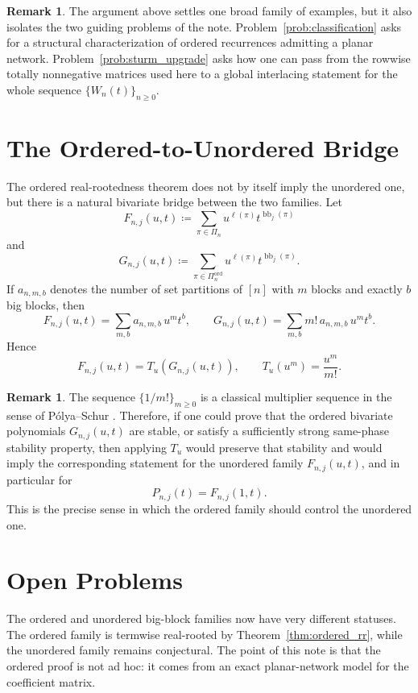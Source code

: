 \documentclass[11pt,reqno]{amsart}
\theoremstyle{definition}
\newtheorem{remark}[theorem]{Remark}
\begin{document}
\begin{remark}\label{rem:template_problem}
The argument above settles one broad family of examples, but it also isolates
the two guiding problems of the note. Problem~\ref{prob:classification} asks
for a structural characterization of ordered recurrences admitting a planar
network. Problem~\ref{prob:sturm_upgrade} asks how one can pass from the
rowwise totally nonnegative matrices used here to a global interlacing
statement for the whole sequence \(\{W_n(t)\}_{n\ge 0}\).
\end{remark}

\section{The Ordered-to-Unordered Bridge}

The ordered real-rootedness theorem does not by itself imply the unordered one,
but there is a natural bivariate bridge between the two families. Let
\[
  F_{n,j}(u,t)
  \coloneqq
  \sum_{\pi \in \Pi_n} u^{\ell(\pi)} t^{\operatorname{bb}_j(\pi)}
\]
and
\[
  G_{n,j}(u,t)
  \coloneqq
  \sum_{\pi \in \Pi_n^{\operatorname{ord}}}
  u^{\ell(\pi)} t^{\operatorname{bb}_j(\pi)}.
\]
If $a_{n,m,b}$ denotes the number of set partitions of $[n]$ with $m$ blocks
and exactly $b$ big blocks, then
\[
  F_{n,j}(u,t) = \sum_{m,b} a_{n,m,b}\,u^m t^b,
  \qquad
  G_{n,j}(u,t) = \sum_{m,b} m!\,a_{n,m,b}\,u^m t^b.
\]
Hence
\[
  F_{n,j}(u,t) = T_u\!\left(G_{n,j}(u,t)\right),
  \qquad
  T_u(u^m)=\frac{u^m}{m!}.
\]

\begin{remark}\label{rem:multiplier_bridge}
The sequence \(\{1/m!\}_{m\geq 0}\) is a classical multiplier sequence in the
sense of P\'olya--Schur \cite{Branden2015}. Therefore, if one could prove that
the ordered bivariate polynomials \(G_{n,j}(u,t)\) are stable, or satisfy a
sufficiently strong same-phase stability property, then applying \(T_u\) would
preserve that stability and would imply the corresponding statement for the
unordered family \(F_{n,j}(u,t)\), and in particular for
\[
  P_{n,j}(t)=F_{n,j}(1,t).
\]
This is the precise sense in which the ordered family should control the
unordered one.
\end{remark}

\section{Open Problems}

The ordered and unordered big-block families now have very different statuses.
The ordered family is termwise real-rooted by Theorem~\ref{thm:ordered_rr},
while the unordered family remains conjectural. The point of this note is that
the ordered proof is not ad hoc: it comes from an exact planar-network model
for the coefficient matrix.
\end{document}
